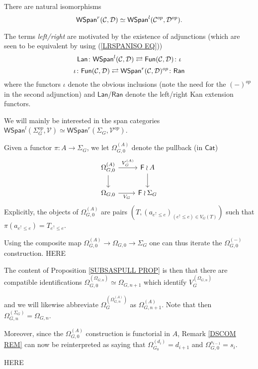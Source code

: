 \documentclass[a4paper,10pt]{article}%
\begin{document}
\begin{remark}
There are natural isomorphisms
\begin{equation}\label{LRSPANISO EQ}
\mathsf{WSpan}^r(\mathcal{C},\mathcal{D}) \simeq \mathsf{WSpan}^l(\mathcal{C}^{op},\mathcal{D}^{op}).
\end{equation}
\end{remark}


\begin{remark}\label{RANLANADJ REM}
The terms \textit{left/right} are motivated by the existence of adjunctions (which are seen to be equivalent by using (\ref{LRSPANISO EQ}))
\[
	\mathsf{Lan} \colon
	\mathsf{WSpan}^l(\mathcal{C}, \mathcal{D})
		\rightleftarrows
	\mathsf{Fun}(\mathcal{C}, \mathcal{D})
	\colon \iota
\]
\[
	\iota \colon 
	\mathsf{Fun}(\mathcal{C}, \mathcal{D})
		\rightleftarrows
	\mathsf{WSpan}^r(\mathcal{C}, \mathcal{D})^{op}
	\colon \mathsf{Ran}
\]
where the functors $\iota$ denote the obvious inclusions 
(note the need for the $(\minus)^{op}$ in the second adjunction) 
and $\mathsf{Lan}$/$\mathsf{Ran}$ denote the left/right Kan extension functors.
\end{remark}


We will mainly be interested in the span categories 
$\mathsf{WSpan}^l(\Sigma_G^{op},\mathcal{V})\simeq 
\mathsf{WSpan}^r(\Sigma_G,\mathcal{V}^{op})$.


\begin{notation}
	Given a functor $\pi \colon A \to \Sigma_G$, we let $\Omega^{(A)}_{G,0}$ denote the pullback (in $\mathsf{Cat}$)
\[
	\begin{tikzcd}
	\Omega_{G,0}^{(A)} \ar{r}{V_G^{(A)}} \ar{d}& 
	\Fin \wr A \ar{d}
\\
	\Omega_{G,0} \ar{r}[swap]{V_G} &
	\Fin \wr \Sigma_G
	\end{tikzcd}
\]
Explicitly, the objects of $\Omega_{G,0}^{(A)}$ are pairs 
$(T,(a_{e^{\uparrow} \leq e})_{(e^{\uparrow} \leq e)\in V_G(T)})$
such that $\pi(a_{e^{\uparrow} \leq e}) = T_{e^{\uparrow} \leq e}$.

Using the composite map 
$\Omega_{G,0}^{(A)} \to \Omega_{G,0} \to \Sigma_G$
one can thus iterate the $\Omega_{G,0}^{(\minus)}$ construction.
{\color{red} HERE}

The content of Proposition \ref{SUBSASPULL PROP} is then that there are compatible identifications
$\Omega_{G,0}^{(\Omega_{G,n})} \simeq \Omega_{G,n+1}$
which identify $V_G^{(\Omega_{G,n})}$

and we will likewise abbreviate 
$\Omega_G^{\left(\Omega_{G,n}^{(A)}\right)}$ as
$\Omega_{G,n+1}^{(A)}$.
Note that then $\Omega_{G,n}^{(\Sigma_G)} = \Omega_{G,n}$.

Moreover, since the $\Omega_{G,0}^{(A)}$ construction is functorial in $A$,
 Remark \ref{DSCOM REM} can now be reinterpreted as saying that 
$\Omega_{G_0}^{(d_i)}=d_{i+1}$ and 
$\Omega_{G,0}^{s_{i-1}}=s_i$.

{\color{red} HERE}

\end{notation}
\end{document}
